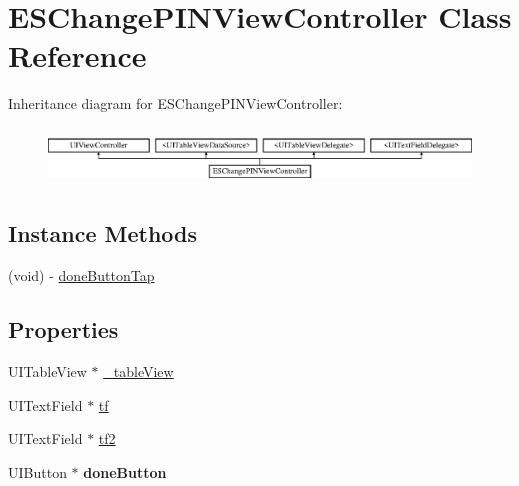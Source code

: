 \hypertarget{interface_e_s_change_p_i_n_view_controller}{}\section{E\+S\+Change\+P\+I\+N\+View\+Controller Class Reference}
\label{interface_e_s_change_p_i_n_view_controller}
Inheritance diagram for E\+S\+Change\+P\+I\+N\+View\+Controller\+:\begin{figure}[H]
\begin{center}
\leavevmode
\includegraphics[height=1.521739cm]{interface_e_s_change_p_i_n_view_controller}
\end{center}
\end{figure}
\subsection*{Instance Methods}
\begin{DoxyCompactItemize}
\item 
(void) -\/ \hyperlink{interface_e_s_change_p_i_n_view_controller_a3c68ed16aba98195bd79207cb7dc1505}{done\+Button\+Tap}
\end{DoxyCompactItemize}
\subsection*{Properties}
\begin{DoxyCompactItemize}
\item 
U\+I\+Table\+View $\ast$ \hyperlink{interface_e_s_change_p_i_n_view_controller_ac994934cb4b58d81c1b79263459470a0}{\+\_\+table\+View}
\item 
U\+I\+Text\+Field $\ast$ \hyperlink{interface_e_s_change_p_i_n_view_controller_af5f130cccef05cacacd022220cb21630}{tf}
\item 
U\+I\+Text\+Field $\ast$ \hyperlink{interface_e_s_change_p_i_n_view_controller_a23a7550403eae431c07f2412d9edb2b2}{tf2}
\item 
\hypertarget{interface_e_s_change_p_i_n_view_controller_a2366ea2d2b790713205caa2a3d14830f}{}U\+I\+Button $\ast$ {\bfseries done\+Button}\label{interface_e_s_change_p_i_n_view_controller_a2366ea2d2b790713205caa2a3d14830f}

\end{DoxyCompactItemize}


